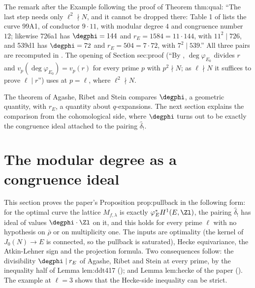 \begin{paperlink}\label{pl:moddeg:99a1}
The remark after the Example following the proof of Theorem thm:qual: ``The last step needs only $\ell^2\nmid N$, and it cannot be dropped there: Table 1 of \cite{ARS12} lists the curve 99A1, of
conductor $9\cdot11$, with modular degree $4$ and congruence number $12$; likewise 726a1 has $\degphi=144$ and $r_E=1584=11\cdot144$, with $11^2\mid726$, and 539d1 has $\degphi=72$ and
$r_E=504=7\cdot72$, with $7^2\mid539$.'' All three pairs are recomputed in . The opening of Section sec:proof (``By \cite[Theorem 2.2]{ARS12}, $\deg\varphi_{E_0}$ divides
$r$ and $v_p(\deg\varphi_{E_0})=v_p(r)$ for every prime $p$ with $p^2\nmid N$; as $\ell\nmid N$ it suffices to prove $\ell\mid r$'') uses  at $p=\ell$, where $\ell^2\nmid N$.
\end{paperlink}

The theorem of Agashe, Ribet and Stein compares $\degphi$, a geometric quantity, with $r_E$, a quantity about $q$-expansions. The next section explains the
comparison from the cohomological side, where $\degphi$ turns out to be exactly the congruence ideal attached to the pairing $\hat\delta_!$.

\section{The modular degree as a congruence ideal}\label{sec:moddeg:degree-eta}

This section proves the paper's Proposition prop:pullback in the following form: for the optimal curve the lattice $M_{f,\lambda}$ is exactly $\varphi_E^*H^1(E,\Zl)$, the pairing
$\hat\delta_!$ has ideal of values $\degphi\cdot\Zl$ on it, and this holds for every prime $\ell$ with no hypothesis on $\bar\rho$ or on multiplicity one. The inputs are optimality (the
kernel of $J_0(N)\to E$ is connected, so the pullback is saturated), Hecke equivariance, the Atkin-Lehner sign and the projection formula. Two consequences follow: the divisibility
$\degphi\mid r_E$ of Agashe, Ribet and Stein at every prime, by the inequality half of Lemma lem:ddt417 (); and Lemma lem:hecke of the paper
(). The example  at $\ell=3$ shows that the Hecke-side inequality can be strict.

